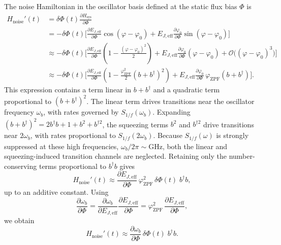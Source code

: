The noise Hamiltonian in the oscillator basis defined at the static flux bias \(\Phi\) is
\begin{equation}
\begin{aligned}
H_{\text{noise}}'(t) 
&= \delta\Phi(t) \frac{\partial H_{\text{sys}}}{\partial \Phi} \\
&= -\delta\Phi(t)\biggl[ 
\frac{\partial E_{J,\mathrm{eff}}}{\partial\Phi} \cos(\varphi - \varphi_0) + E_{J,\mathrm{eff}} \frac{\partial \varphi_0}{\partial\Phi} \sin(\varphi - \varphi_0) 
\biggr] \\
&\approx -\delta\Phi(t)\biggl[
\frac{\partial E_{J,\mathrm{eff}}}{\partial\Phi}
\left(1-\frac{(\varphi-\varphi_0)^2}{2}\right)+ E_{J,\mathrm{eff}}\frac{\partial \varphi_0}{\partial\Phi}(\varphi-\varphi_0)
+ \mathcal{O}\big((\varphi-\varphi_0)^3\big)
\biggr] \\
&\approx -\delta\Phi(t)\biggl[
\frac{\partial E_{J,\mathrm{eff}}}{\partial\Phi}
\left(1-\frac{\varphi_{\mathrm{ZPF}}^2}{2}(b+b^\dagger)^2\right) + E_{J,\mathrm{eff}}\frac{\partial \varphi_0}{\partial\Phi}\,
\varphi_{\mathrm{ZPF}}(b+b^\dagger)
\biggr].
\end{aligned}
\end{equation}
This expression contains a term linear in \(b+b^\dagger\) and a quadratic term proportional to \((b+b^\dagger)^2\). The linear term drives transitions near the oscillator frequency \(\omega_b\), with rates governed by \(S_{1/f}(\omega_b)\). Expanding \((b+b^\dagger)^2 = 2b^\dagger b + 1 + b^2 + b^{\dagger 2}\), the squeezing terms \(b^2\) and \(b^{\dagger 2}\) drive transitions near \(2\omega_b\), with rates proportional to \(S_{1/f}(2\omega_b)\). Because \(S_{1/f}(\omega)\) is strongly suppressed at these high frequencies, \(\omega_b/2\pi\sim\mathrm{GHz}\), both the linear and squeezing-induced transition channels are neglected. Retaining only the number-conserving terms proportional to \(b^\dagger b\) gives
\begin{equation}
H_{\text{noise}}'(t)\approx
\frac{\partial E_{J,\mathrm{eff}}}{\partial\Phi}\,\varphi_{\mathrm{ZPF}}^2\,
\delta\Phi(t)\; b^\dagger b ,
\end{equation}
up to an additive constant. Using
\begin{equation}
\frac{\partial\omega_b}{\partial\Phi}
=
\frac{\partial\omega_b}{\partial E_{J,\mathrm{eff}}}\frac{\partial E_{J,\mathrm{eff}}}{\partial\Phi}
=
\varphi_{\mathrm{ZPF}}^2\,\frac{\partial E_{J,\mathrm{eff}}}{\partial\Phi},
\label{eq:sensitivity_deriv}
\end{equation}
we obtain
\begin{equation}
H_{\text{noise}}'(t)\approx
\frac{\partial\omega_b}{\partial\Phi}\,\delta\Phi(t)\; b^\dagger b .
\end{equation}


